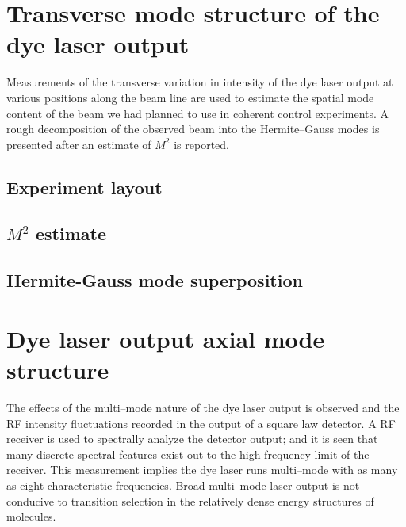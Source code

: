 
\section{Transverse mode structure of the dye laser output}
Measurements of the transverse variation in intensity of the dye laser output at various positions along the beam line are used to estimate the spatial mode content of the beam we had planned to use in coherent control experiments. A rough decomposition of the observed beam into the Hermite--Gauss modes is presented after an estimate of $M^2$ \cite{Siegman:1993a} is reported.
\subsection{Experiment layout}

\subsection{$M^2$ estimate}

\subsection{Hermite-Gauss mode superposition}
\label{HG section}

\section{Dye laser output axial mode structure}
The effects of the multi--mode nature of the dye laser output is observed and the RF intensity fluctuations recorded in the output of a square law detector. A RF receiver is used to spectrally analyze the detector output; and it is seen that many discrete spectral features exist out to the high frequency limit of the receiver. This measurement implies the dye laser runs multi--mode with as many as eight characteristic frequencies. Broad multi--mode laser output is not conducive to transition selection in the relatively dense energy structures of molecules.
